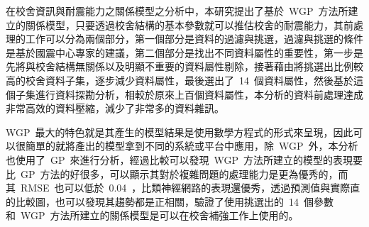 
在校舍資訊與耐震能力之關係模型之分析中，本研究提出了基於~WGP~方法所建立的關係模型，只要透過校舍結構的基本參數就可以推估校舍的耐震能力，其前處理的工作可以分為兩個部分，第一個部分是資料的過濾與挑選，過濾與挑選的條件是基於國震中心專家的建議，第二個部分是找出不同資料屬性的重要性，第一步是先將與校舍結構無關係以及明顯不重要的資料屬性剔除，接著藉由將挑選出比例較高的校舍資料子集，逐步減少資料屬性，最後選出了~14~個資料屬性，然後基於這個子集進行資料探勘分析，相較於原來上百個資料屬性，本分析的資料前處理達成非常高效的資料壓縮，減少了非常多的資料雜訊。


WGP~最大的特色就是其產生的模型結果是使用數學方程式的形式來呈現，因此可以很簡單的就將產出的模型拿到不同的系統或平台中應用，除~WGP~外，本分析也使用了~GP~來進行分析，經過比較可以發現~WGP~方法所建立的模型的表現要比~GP~方法的好很多，可以顯示其對於複雜問題的處理能力是更為優秀的，而其~RMSE~也可以低於~0.04~，比類神經網路的表現還優秀，透過預測值與實際直的比較圖，也可以發現其趨勢都是正相關，驗證了使用挑選出的~14~個參數和~WGP~方法所建立的關係模型是可以在校舍補強工作上使用的。

